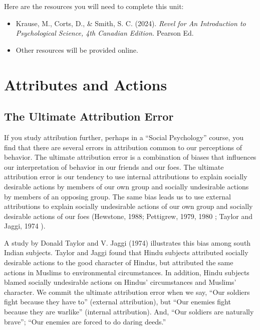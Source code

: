 \documentclass[
]{book}
\providecommand{\tightlist}{%
  \setlength{\itemsep}{0pt}\setlength{\parskip}{0pt}}
\begin{document}
Here are the resources you will need to complete this unit:

\begin{itemize}
\tightlist
\item
  Krause, M., Corts, D., \& Smith, S. C. (2024). \emph{Revel for An Introduction to Psychological Science, 4th Canadian Edition.} Pearson Ed.
\item
  Other resources will be provided online.
\end{itemize}

\hypertarget{attributes-and-actions}{%
\section{Attributes and Actions}\label{attributes-and-actions}}

\hypertarget{the-ultimate-attribution-error}{%
\subsection*{The Ultimate Attribution Error}\label{the-ultimate-attribution-error}}

If you study attribution further, perhaps in a ``Social Psychology'' course, you find that there are several errors in attribution common to our perceptions of behavior. The ultimate attribution error is a combination of biases that influences our interpretation of behavior in our friends and our foes. The ultimate attribution error is our tendency to use internal attributions to explain socially desirable actions by members of our own group and socially undesirable actions by members of an opposing group. The same bias leads us to use external attributions to explain socially undesirable actions of our own group and socially desirable actions of our foes (Hewstone, 1988; Pettigrew, 1979, 1980 ; Taylor and Jaggi, 1974 ).

A study by Donald Taylor and V. Jaggi (1974) illustrates this bias among south Indian subjects. Taylor and Jaggi found that Hindu subjects attributed socially desirable actions to the good character of Hindus, but attributed the same actions in Muslims to environmental circumstances. In addition, Hindu subjects blamed socially undesirable actions on Hindus' circumstances and Muslims' character. We commit the ultimate attribution error when we say, ``Our soldiers fight because they have to'' (external attribution), but ``Our enemies fight because they are warlike'' (internal attribution). And, ``Our soldiers are naturally brave''; ``Our enemies are forced to do daring deeds.''
\end{document}
